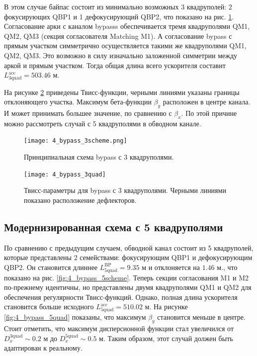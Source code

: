 \par В этом случае байпас состоит из минимально возможных 3 квадруполей: 2 фокусирующих QBP1 и 1 дефокусирующий QBP2, что показано на рис. \ref{fig:4_bypass_3scheme}. Согласование арки с каналом bypasss обеспечивается тремя квадруполями QM1, QM2, QM3 (секция согласователя Matching M1). А согласование bypass с прямым участком симметрично осуществляется такими же квадруполями QM1, QM2, QM3. Это возможно в силу изначально заложенной симметрии между аркой и прямым участком. Тогда общая длина всего ускорителя составит $L_{\textrm{3quad}}^{\textrm{acc}}=503.46$ м.
\par На рисунке \ref{fig:4_bypass_3quad} приведены Твисс-функции, черными линиями указаны границы отклоняющего участка. Максимум бета-функции $\beta_y$ расположен в центре канала. И может принимать большее значение, по сравнению с $\beta_{x}$. По этой причине можно рассмотреть случай с 5 квадруполями в обводном канале.

\begin{figure}[!h]
  \centering
   \texttt{[image: 4\_bypass\_3scheme.png]}
   \caption{Принципиальная схема bypass с 3 квадруполями.}
   \label{fig:4_bypass_3scheme}
\end{figure}

\begin{figure}[!h]
  \centering
   \texttt{[image: 4\_bypass\_3quad]}
   \caption{Твисс-параметры для bypass с 3 квадруполями. Черными линиями показано расположение дефлекторов.}
   \label{fig:4_bypass_3quad}
\end{figure}

	\subsection{Модернизированная схема с 5 квадруполями}\label{sec:EDM/Wien_filter/ByPass/5quad}

\par По сравнению с предыдущим случаем, обводной канал состоит из 5 квадруполей, которые представлены 2 семействами: фокусирующим QBP1 и дефокусирующим QBP2. Он становится длиннее $L_{\textrm{5quad}}^{\textrm{BP}}=9.35$ м и отклоняется на $1.46$ м., что показано на рис. \ref{fig:4_bypass_5scheme}. Теперь секции согласования M1 и M2 по-прежнему идентичны, но представлены двумя квадруполями QM1 и QM2 для обеспечения регулярности Твисс-функций. Однако, полная длина ускорителя становится больше исходного $L_{\textrm{5quad}}^{\textrm{acc}}=510.02$ м. На рисунке \ref{fig:4_bypass_5quad} показаны, что максимум $\beta_y$ становится меньше в центре. Стоит отметить, что максимум дисперсионной функции стал увеличился от $D_x^{\textrm{3quad}} \sim 0.2$ м до $D_x^{\textrm{5quad}} \sim 0.5$ м. Таким образом, этот случай должен быть адаптирован к реальному.

